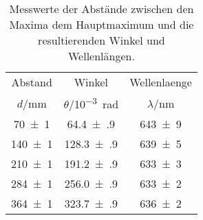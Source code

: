 \begin{table}[!h]
	\centering
	\begin{tabular}{ccc}
		\toprule
		Abstand & Winkel & Wellenlaenge\\
		$d$/\si{mm} & $\theta$/\si{10^{-3} rad} & $\lambda$/\si{\nano\meter}\\
\midrule
		\num{70(1)} & \num{64.4(9)} & \num{643(9)}\\
		\num{140(1)} & \num{128.3(9)} & \num{639(5)}\\
		\num{210(1)} & \num{191.2(9)} & \num{633(3)}\\
		\num{284(1)} & \num{256.0(9)} & \num{633(2)}\\
		\num{364(1)} & \num{323.7(9)} & \num{636(2)}\\
		\bottomrule
	\end{tabular}
	\caption{Messwerte der Abstände zwischen den Maxima dem Hauptmaximum und die resultierenden Winkel und Wellenlängen. \label{tab:Wellenlaengen}}
\end{table}
